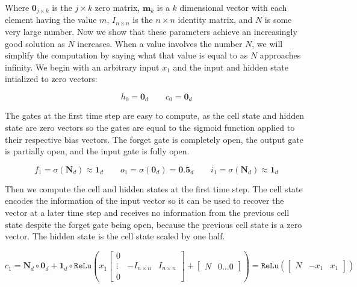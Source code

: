 \documentclass[12pt]{article}
\begin{document}







Where $\textbf{0}_{j\times k}$ is the $j \times k$ zero matrix, $\textbf{m}_k$ is a $k$ dimensional vector with each element having the value $m$, $I_{n\times n}$ is the $n \times n$ identity matrix, and $N$ is some very large number.  Now we show that these parameters achieve an increasingly good solution as $N$ increases. When a value involves the number $N$, we will simplify the computation by saying what that value is equal to as $N$ approaches infinity. We begin with an arbitrary input $x_1$ and the input and hidden state intialized to zero vectors:

\[ h_0 = \textbf{0}_d \qquad c_0 = \textbf{0}_d\]

The gates at the first time step are easy to compute, as the cell state and hidden state are zero vectors so the gates are equal to the sigmoid function applied to their respective bias vectors. The forget gate is completely open, the output gate is partially open, and the input gate is fully open.

\[  f_1 = \sigma(\textbf{N}_d) \approx \textbf{1}_d \qquad o_1 = \sigma(\textbf{0}_d) = \textbf{0.5}_d \qquad i_1 =  \sigma(\textbf{N}_d) \approx \textbf{1}_d\]

Then we compute the cell and hidden states at the first time step. The cell state encodes the information of the input vector so it can be used to recover the vector at a later time step and receives no information from the previous cell state despite the forget gate being open, because the previous cell state is a zero vector. The hidden state is the cell state scaled by one half.

\[ c_1 = \textbf{N}_d\circ \textbf{0}_d+  \textbf{1}_d \circ \texttt{ReLu} (x_1\begin{bmatrix} 0 &  & \\ \vdots & -I_{n \times n} & I_{n \times n}\\ 0 & &  \end{bmatrix} + \begin{bmatrix} N & 0 \dots 0\end{bmatrix}) = \texttt{ReLu} ( \begin{bmatrix} N & -x_1 & x_1 \end{bmatrix})\]
\end{document}
